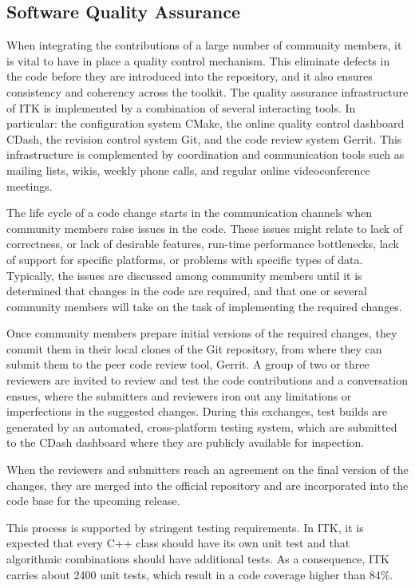 \documentclass{frontiersENG} %
\begin{document}
\subsection{Software Quality Assurance}

When integrating the contributions of a large number of community members, it
is vital to have in place a quality control mechanism. This eliminate defects
in the code before they are introduced into the repository, and it also ensures
consistency and coherency across the toolkit.  The quality assurance
infrastructure of ITK is implemented by a combination of several interacting
tools. In particular: the configuration system CMake, the online quality
control dashboard CDash, the revision control system Git, and the code review
system Gerrit. This infrastructure is complemented by coordination and
communication tools such as mailing lists, wikis, weekly phone calls, and
regular online videoconference meetings.

The life cycle of a code change starts in the communication channels when
community members raise issues in the code. These issues might relate to lack
of correctness, or lack of desirable features, run-time performance
bottlenecks, lack of support for specific platforms, or problems with specific
types of data. Typically, the issues are discussed among community members
until it is determined that changes in the code are required, and that one or
several community members will take on the task of implementing the required
changes.

Once community members prepare initial versions of the required changes, they
commit them in their local clones of the Git repository, from where they can
submit them to the peer code review tool, Gerrit. A group of two or three
reviewers are invited to review and test the code contributions and a
conversation ensues, where the submitters and reviewers iron out any
limitations or imperfections in the suggested changes. During this exchanges,
test builds are generated by an automated, cross-platform testing system, which
are submitted to the CDash dashboard where they are publicly available for
inspection.

When the reviewers and submitters reach an agreement on the final version of
the changes, they are merged into the official repository and are incorporated
into the code base for the upcoming release.

This process is supported by stringent testing requirements. In ITK, it is
expected that every C++ class should have its own unit test and that
algorithmic combinations should have additional tests. As a consequence, ITK
carries about 2400 unit tests, which result in a code coverage
higher than 84\%.
\end{document}
